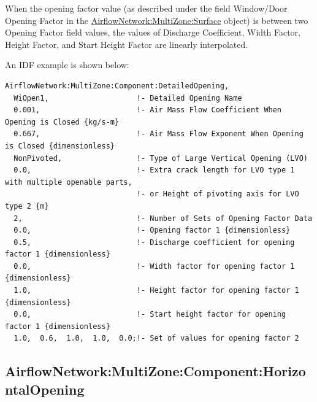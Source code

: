 When the opening factor value (as described under the field Window/Door Opening Factor in the \hyperref[airflownetworkmultizonesurface]{AirflowNetwork:MultiZone:Surface} object) is between two Opening Factor field values, the values of Discharge Coefficient, Width Factor, Height Factor, and Start Height Factor are linearly interpolated.

An IDF example is shown below:

\begin{lstlisting}
AirflowNetwork:MultiZone:Component:DetailedOpening,
  WiOpen1,                    !- Detailed Opening Name
  0.001,                      !- Air Mass Flow Coefficient When Opening is Closed {kg/s-m}
  0.667,                      !- Air Mass Flow Exponent When Opening is Closed {dimensionless}
  NonPivoted,                 !- Type of Large Vertical Opening (LVO)
  0.0,                        !- Extra crack length for LVO type 1 with multiple openable parts,
                              !- or Height of pivoting axis for LVO type 2 {m}
  2,                          !- Number of Sets of Opening Factor Data
  0.0,                        !- Opening factor 1 {dimensionless}
  0.5,                        !- Discharge coefficient for opening factor 1 {dimensionless}
  0.0,                        !- Width factor for opening factor 1 {dimensionless}
  1.0,                        !- Height factor for opening factor 1 {dimensionless}
  0.0,                        !- Start height factor for opening factor 1 {dimensionless}
  1.0,  0.6,  1.0,  1.0,  0.0;!- Set of values for opening factor 2
\end{lstlisting}

\subsection{AirflowNetwork:MultiZone:Component:HorizontalOpening}\label{airflownetworkmultizonecomponenthorizontalopening}

